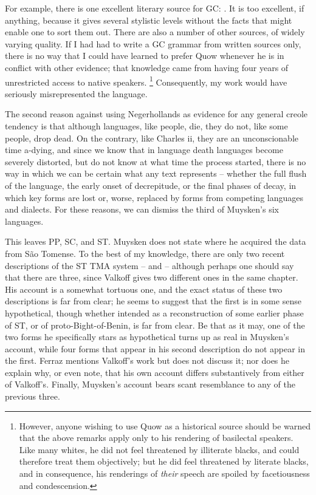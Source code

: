 For example, there is one excellent literary source for GC: \citet{Quow1877}. It is too excellent, if anything, because it gives several stylistic levels without the facts that might enable one to sort them out. There are also a number of other sources, of widely varying quality. If I had had to write a GC grammar from written sources only, there is no way that I could have learned to prefer Quow whenever he is in conflict with other evidence; that knowledge came from having four years of unrestricted access to native speakers.%
\footnote{However, anyone wishing to use Quow as a historical source should be warned that the above remarks apply only to his rendering of basilectal speakers. Like many whites, he did not feel threatened by illiterate blacks, and could therefore treat them objectively; but he did feel threatened by literate blacks, and in consequence, his ren\-derings of \textit{their} speech are spoiled by facetiousness and condescension.}
Consequently, my work would have seriously misrepresented the language.


The second reason against using Negerhollands as evidence for any general creole tendency is that although languages, like people, die, they do not, like some people, drop dead. On the contrary, like Charles {\sc ii}, they are an unconscionable time a-dying, and since we know that in language death languages become severely distorted, but do not know at what time the process started, there is no way in which we can be certain what any text represents -- whether the full flush of the language, the early onset of decrepitude, or the final phases of decay, in which key forms are lost or, worse, replaced by forms from competing languages and dialects. For these reasons, we can dismiss the third of Muysken's six languages.

This leaves PP, SC, and ST. Muysken does not state where he acquired the data from S{\~a}o Tomense. To the best of my knowledge, there are only two recent descriptions of the ST TMA system -- \citealt{Valkoff1966} and \citealt{Ferraz1979} -- although perhaps one should say that there are three, since Valkoff gives two different ones in the same chapter. His account is a somewhat tortuous one, and the exact status of these two descriptions is far from clear; he seems to suggest that the first is in some sense hypothetical, though whether intended as a reconstruc\-tion of some earlier phase of ST, or of proto-Bight-of-Benin, is far from clear. Be that as it may, one of the two forms he specifically stars as hypothetical turns up as real in Muysken's account, while four forms that appear in his second description do not appear in the first. Ferraz mentions Valkoff's work but does not discuss it; nor does he explain why, or even note, that his own account differs substantively from either of Valkoff's. Finally, Muysken's account bears scant resemblance to any of the previous three.

